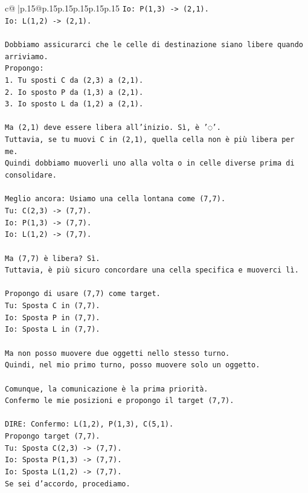 \documentclass{article}
\begin{document}
{\begin{supertabular}{c@{$\;$}|p{.15\linewidth}@{}p{.15\linewidth}p{.15\linewidth}p{.15\linewidth}p{.15\linewidth}p{.15\linewidth}}
{{{\texttt{Io: P(1,3) {-}> (2,1).} \\
\texttt{Io: L(1,2) {-}> (2,1).} \\
\\ 
\texttt{Dobbiamo assicurarci che le celle di destinazione siano libere quando arriviamo.} \\
\texttt{Propongo:} \\
\texttt{1. Tu sposti C da (2,3) a (2,1).} \\
\texttt{2. Io sposto P da (1,3) a (2,1).} \\
\texttt{3. Io sposto L da (1,2) a (2,1).} \\
\\ 
\texttt{Ma (2,1) deve essere libera all'inizio. Sì, è '◌'.} \\
\texttt{Tuttavia, se tu muovi C in (2,1), quella cella non è più libera per me.} \\
\texttt{Quindi dobbiamo muoverli uno alla volta o in celle diverse prima di consolidare.} \\
\\ 
\texttt{Meglio ancora: Usiamo una cella lontana come (7,7).} \\
\texttt{Tu: C(2,3) {-}> (7,7).} \\
\texttt{Io: P(1,3) {-}> (7,7).} \\
\texttt{Io: L(1,2) {-}> (7,7).} \\
\\ 
\texttt{Ma (7,7) è libera? Sì.} \\
\texttt{Tuttavia, è più sicuro concordare una cella specifica e muoverci lì.} \\
\\ 
\texttt{Propongo di usare (7,7) come target.} \\
\texttt{Tu: Sposta C in (7,7).} \\
\texttt{Io: Sposta P in (7,7).} \\
\texttt{Io: Sposta L in (7,7).} \\
\\ 
\texttt{Ma non posso muovere due oggetti nello stesso turno.} \\
\texttt{Quindi, nel mio primo turno, posso muovere solo un oggetto.} \\
\\ 
\texttt{Comunque, la comunicazione è la prima priorità.} \\
\texttt{Confermo le mie posizioni e propongo il target (7,7).} \\
\\ 
\texttt{DIRE: Confermo: L(1,2), P(1,3), C(5,1).} \\
\texttt{Propongo target (7,7).} \\
\texttt{Tu: Sposta C(2,3) {-}> (7,7).} \\
\texttt{Io: Sposta P(1,3) {-}> (7,7).} \\
\texttt{Io: Sposta L(1,2) {-}> (7,7).} \\
\texttt{Se sei d'accordo, procediamo.} \\
            }
        }
    }
     \\ \\


\end{supertabular}}
\end{document}
